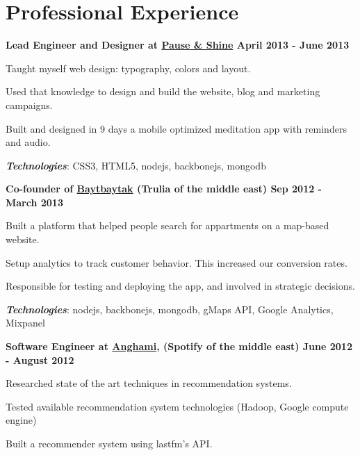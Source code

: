 \section{Professional Experience}
\textbf{Lead Engineer and Designer at \href{http://pauseandshine.com/}{Pause \& Shine} \hfill \small April 2013 - June 2013} 
\vspace{0.1cm}
\begin{innerlist}
\item Taught myself web design: typography, colors and layout. 
\item Used that knowledge to design and build the website, blog and marketing campaigns.
\item Built and designed in 9 days a mobile optimized meditation app with reminders and audio.
\end{innerlist}

\vspace{0.2cm}
\hspace{0.25cm}\textbf{\textit{Technologies}}: 
CSS3, HTML5, nodejs, backbonejs, mongodb

\vspace{0.4cm}

\textbf{Co-founder of \href{http://baytbaytak.com}{Baytbaytak} (Trulia of the middle east) \hfill \small Sep 2012 - March 2013} 
\vspace{0.1cm}
\begin{innerlist}
\item Built a platform that helped people search for appartments on a map-based website.  
\item Setup analytics to track customer behavior. This increased our conversion rates. 
\item Responsible for testing and deploying the app, and involved in strategic decisions.
\end{innerlist}

\vspace{0.2cm}
\hspace{0.25cm}\textbf{\textit{Technologies}}: 
nodejs, backbonejs, mongodb, gMaps API, Google Analytics, Mixpanel

\vspace{0.4cm}

\textbf{
  Software Engineer at \href{http://anghami.com/}{Anghami}, (Spotify of the middle east)
  \hfill \small June 2012 - August 2012
}
\vspace{0.1cm}
\begin{innerlist}
\item Researched state of the art techniques in recommendation systems.
\item Tested available recommendation system technologies (Hadoop, Google compute engine)
\item Built a recommender system using lastfm's API.
\end{innerlist}


